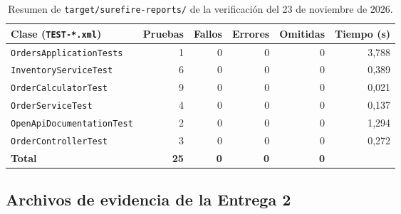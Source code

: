 \documentclass[11pt,a4paper]{article}
\begin{document}
\begin{table}[H]
\centering
\small
\begin{tabular}{@{}l r r r r r@{}}
\toprule
\textbf{Clase (\texttt{TEST-*.xml})} & \textbf{Pruebas} & \textbf{Fallos} & \textbf{Errores} &
\textbf{Omitidas} & \textbf{Tiempo (s)}\\
\midrule
\texttt{OrdersApplicationTests} & 1 & 0 & 0 & 0 & 3,788\\
\texttt{InventoryServiceTest} & 6 & 0 & 0 & 0 & 0,389\\
\texttt{OrderCalculatorTest} & 9 & 0 & 0 & 0 & 0,021\\
\texttt{OrderServiceTest} & 4 & 0 & 0 & 0 & 0,137\\
\texttt{OpenApiDocumentationTest} & 2 & 0 & 0 & 0 & 1,294\\
\texttt{OrderControllerTest} & 3 & 0 & 0 & 0 & 0,272\\
\midrule
\textbf{Total} & \textbf{25} & \textbf{0} & \textbf{0} & \textbf{0} & \\
\bottomrule
\end{tabular}
\caption{Resumen de \texttt{target/surefire-reports/} de la verificación del 23 de noviembre de 2026.}
\label{tab:surefire}
\end{table}

\subsection{Archivos de evidencia de la Entrega 2}
\end{document}
